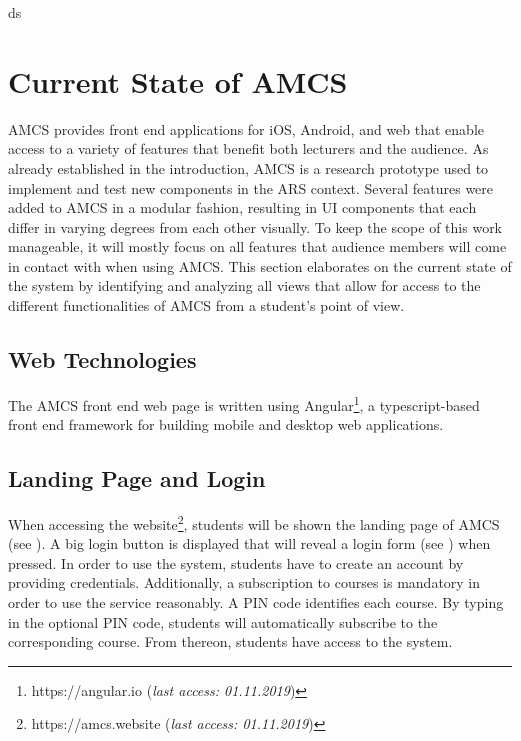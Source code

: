 ds\chapter{Current State of AMCS}
\label{chapter:stateoftheart}
AMCS provides front end applications for iOS, Android, and web that enable access to a variety of features that benefit both lecturers and the audience.
As already established in the introduction, AMCS is a research prototype used to implement and test new components in the ARS context.
Several features were added to AMCS in a modular fashion, resulting in UI components that each differ in varying degrees from each other visually. 
To keep the scope of this work manageable, it will mostly focus on all features that audience members will come in contact with when using AMCS.  
This section elaborates on the current state of the system by identifying and analyzing all views that allow for access to the different functionalities of AMCS from a student's point of view. 

\section{Web Technologies}
The AMCS front end web page is written using Angular\footnote{https://angular.io (\emph{last access: 01.11.2019})}, a typescript-based front end framework for building mobile and desktop web applications.

\section{Landing Page and Login}
\label{section:landingpage}
When accessing the website\footnote{https://amcs.website (\emph{last access: 01.11.2019})}, students will be shown the landing page of AMCS (see ). A big login button is displayed that will reveal a login form (see ) when pressed.
In order to use the system, students have to create an account by providing credentials.
\newline
\newline
Additionally, a subscription to courses is mandatory in order to use the service reasonably. A PIN code identifies each course. By typing in the optional PIN code, students will automatically subscribe to the corresponding course. From thereon, students have access to the system. 

